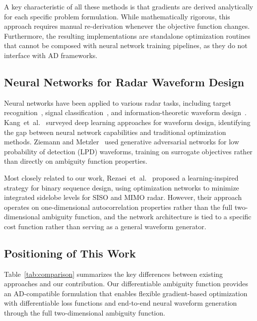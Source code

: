 \documentclass[journal]{IEEEtran}
\begin{document}
A key characteristic of all these methods is that gradients are derived analytically for each specific problem formulation.
While mathematically rigorous, this approach requires manual re-derivation whenever the objective function changes.
Furthermore, the resulting implementations are standalone optimization routines that cannot be composed with neural network training pipelines, as they do not interface with AD frameworks.

\subsection{Neural Networks for Radar Waveform Design}

Neural networks have been applied to various radar tasks, including target recognition~\cite{del2024decentralised}, signal classification~\cite{senica2024artificial}, and information-theoretic waveform design~\cite{herr2024information}.
Kang~et~al.~\cite{kang2023deep} surveyed deep learning approaches for waveform design, identifying the gap between neural network capabilities and traditional optimization methods.
Ziemann and Metzler~\cite{ziemann2023adaptive} used generative adversarial networks for low probability of detection (LPD) waveforms, training on surrogate objectives rather than directly on ambiguity function properties.

Most closely related to our work, Rezaei~et~al.~\cite{rezaei2023learning} proposed a learning-inspired strategy for binary sequence design, using optimization networks to minimize integrated sidelobe levels for SISO and MIMO radar.
However, their approach operates on one-dimensional autocorrelation properties rather than the full two-dimensional ambiguity function, and the network architecture is tied to a specific cost function rather than serving as a general waveform generator.

\subsection{Positioning of This Work}

Table~\ref{tab:comparison} summarizes the key differences between existing approaches and our contribution.
Our differentiable ambiguity function provides an AD-compatible formulation that enables flexible gradient-based optimization with differentiable loss functions and end-to-end neural waveform generation through the full two-dimensional ambiguity function.
\end{document}
